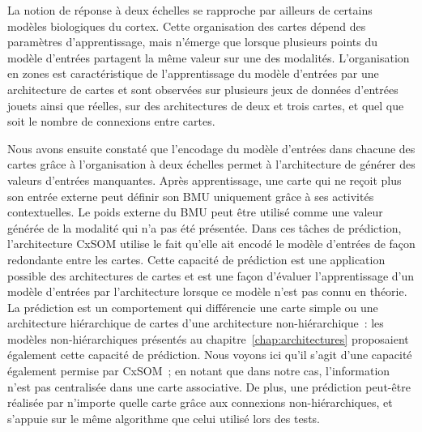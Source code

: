 \documentclass[../main]{subfiles}
\begin{document}
La notion de réponse à deux échelles se rapproche par ailleurs de certains modèles biologiques du cortex.
Cette organisation des cartes dépend des paramètres d'apprentissage, mais n'émerge que lorsque plusieurs points du modèle d'entrées partagent la même valeur sur une des modalités.
L'organisation en zones est caractéristique de l'apprentissage du modèle d'entrées par une architecture de cartes et sont observées sur plusieurs jeux de données d'entrées jouets ainsi que réelles, sur des architectures de deux et trois cartes, et quel que soit le nombre de connexions entre cartes.


Nous avons ensuite constaté que l'encodage du modèle d'entrées dans chacune des cartes grâce à l'organisation à deux échelles permet à l'architecture de générer des valeurs d'entrées manquantes. Après apprentissage, une carte qui ne reçoit plus son entrée externe peut définir son BMU uniquement grâce à ses activités contextuelles.
Le poids externe du BMU peut être utilisé comme une valeur générée de la modalité qui n'a pas été présentée.
Dans ces tâches de prédiction, l'architecture CxSOM utilise le fait qu'elle ait encodé le modèle d'entrées de façon redondante entre les cartes. 
Cette capacité de prédiction est une application possible des architectures de cartes et est une façon d'évaluer l'apprentissage d'un modèle d'entrées par l'architecture lorsque ce modèle n'est pas connu en théorie.
La prédiction est un comportement qui différencie une carte simple ou une architecture hiérarchique de cartes d'une architecture non-hiérarchique~: les modèles non-hiérarchiques présentés au chapitre~\ref{chap:architectures} proposaient également cette capacité de prédiction. Nous voyons ici qu'il s'agit d'une capacité également permise par CxSOM~; en notant que dans notre cas, l'information n'est pas centralisée dans une carte associative. De plus, une prédiction peut-être réalisée par n'importe quelle carte grâce aux connexions non-hiérarchiques, et s'appuie sur le même algorithme que celui utilisé lors des tests.
\end{document}
